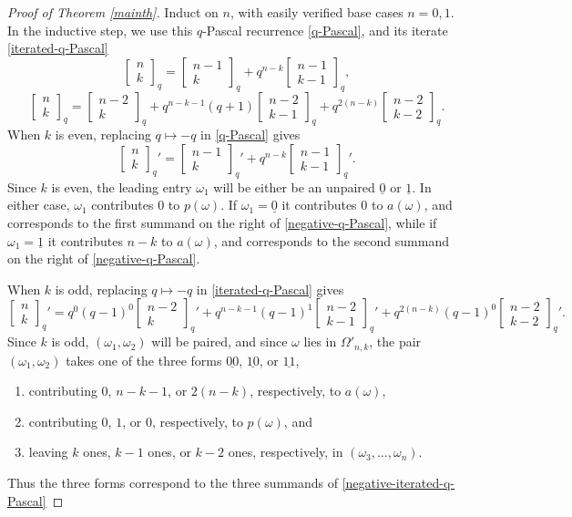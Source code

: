 \documentclass[10pt]{amsart}
\theoremstyle{plain}
\theoremstyle{definition}
\theoremstyle{remark}
\numberwithin{equation}{section}
\newcommand\qbin[3]{\left[\begin{matrix} #1 \\ #2 \end{matrix} \right]_{#3}}
\begin{document}
\begin{proof}[Proof of Theorem \ref{mainth}]
Induct on $n$, with easily verified base cases $n=0,1$.
In the inductive step, we use this
$q$-Pascal recurrence \eqref{q-Pascal}, and 
its iterate \eqref{iterated-q-Pascal}
\begin{equation}
\label{q-Pascal}
\qbin{n}{k}{q} =
\qbin{n-1}{k}{q} +
q^{n-k} \qbin{n-1}{k-1}{q},
\end{equation}
\begin{equation}
\label{iterated-q-Pascal}
\qbin{n}{k}{q}=
\qbin{n-2}{k}{q} +
q^{n-k-1} (q+1) \qbin{n-2}{k-1}{q} +
q^{2(n-k)} \qbin{n-2}{k-2}{q}.
\end{equation}
When $k$ is even, replacing $q \mapsto -q$ in \eqref{q-Pascal} gives
\begin{equation}
\label{negative-q-Pascal}
\qbin{n}{k}{q}'=\qbin{n-1}{k}{q}' + q^{n-k} \qbin{n-1}{k-1}{q}'.
\end{equation}
Since $k$ is even, the leading entry $\omega_1$ will be either be
an unpaired $\underline{0}$ or $\underline{1}$.  In either case,
$\omega_1$ contributes $0$ to $p(\omega)$.  If $\omega_1=\underline{0}$
it contributes $0$ to $a(\omega)$, and corresponds to the first
summand on the right of \eqref{negative-q-Pascal}, while if
$\omega_1=\underline{1}$ it contributes $n-k$ to $a(\omega)$, and 
corresponds to the second summand on the right of \eqref{negative-q-Pascal}.

When $k$ is odd, replacing $q \mapsto -q$ in \eqref{iterated-q-Pascal} gives
\begin{equation}
\label{negative-iterated-q-Pascal}
\qbin{n}{k}{q}'=
q^0(q-1)^0 \qbin{n-2}{k}{q}'+
q^{n-k-1} (q-1)^1 \qbin{n-2}{k-1}{q}' +
q^{2(n-k)}(q-1)^0 \qbin{n-2}{k-2}{q}'.
\end{equation}
Since $k$ is odd, $(\omega_1,\omega_2)$ will be paired, and
since $\omega$ lies in $\Omega'_{n,k}$, the pair $(\omega_1,\omega_2)$
takes one of
the three forms $\underline{00}$, $\underline{10}$, or $\underline{11}$,
\begin{enumerate}
\item[$\bullet$]
contributing $0$, $n-k-1$, or $2(n-k)$, respectively, to $a(\omega)$, 
\item[$\bullet$]
contributing $0$, $1$, or $0$, respectively, to $p(\omega)$, and
\item[$\bullet$]
leaving $k$ ones, $k-1$ ones, or $k-2$ ones, respectively, in $(\omega_3,\ldots,\omega_n)$.
\end{enumerate}
Thus the three forms correspond to the three summands of \eqref{negative-iterated-q-Pascal}
\end{proof}
\end{document}
